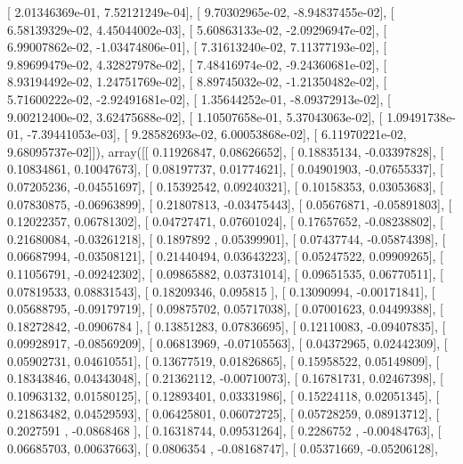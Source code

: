 \documentclass{article}
\begin{document}
       [  2.01346369e-01,   7.52121249e-04],
       [  9.70302965e-02,  -8.94837455e-02],
       [  6.58139329e-02,   4.45044002e-03],
       [  5.60863133e-02,  -2.09296947e-02],
       [  6.99007862e-02,  -1.03474806e-01],
       [  7.31613240e-02,   7.11377193e-02],
       [  9.89699479e-02,   4.32827978e-02],
       [  7.48416974e-02,  -9.24360681e-02],
       [  8.93194492e-02,   1.24751769e-02],
       [  8.89745032e-02,  -1.21350482e-02],
       [  5.71600222e-02,  -2.92491681e-02],
       [  1.35644252e-01,  -8.09372913e-02],
       [  9.00212400e-02,   3.62475688e-02],
       [  1.10507658e-01,   5.37043063e-02],
       [  1.09491738e-01,  -7.39441053e-03],
       [  9.28582693e-02,   6.00053868e-02],
       [  6.11970221e-02,   9.68095737e-02]]), array([[ 0.11926847,  0.08626652],
       [ 0.18835134, -0.03397828],
       [ 0.10834861,  0.10047673],
       [ 0.08197737,  0.01774621],
       [ 0.04901903, -0.07655337],
       [ 0.07205236, -0.04551697],
       [ 0.15392542,  0.09240321],
       [ 0.10158353,  0.03053683],
       [ 0.07830875, -0.06963899],
       [ 0.21807813, -0.03475443],
       [ 0.05676871, -0.05891803],
       [ 0.12022357,  0.06781302],
       [ 0.04727471,  0.07601024],
       [ 0.17657652, -0.08238802],
       [ 0.21680084, -0.03261218],
       [ 0.1897892 ,  0.05399901],
       [ 0.07437744, -0.05874398],
       [ 0.06687994, -0.03508121],
       [ 0.21440494,  0.03643223],
       [ 0.05247522,  0.09909265],
       [ 0.11056791, -0.09242302],
       [ 0.09865882,  0.03731014],
       [ 0.09651535,  0.06770511],
       [ 0.07819533,  0.08831543],
       [ 0.18209346,  0.095815  ],
       [ 0.13090994, -0.00171841],
       [ 0.05688795, -0.09179719],
       [ 0.09875702,  0.05717038],
       [ 0.07001623,  0.04499388],
       [ 0.18272842, -0.0906784 ],
       [ 0.13851283,  0.07836695],
       [ 0.12110083, -0.09407835],
       [ 0.09928917, -0.08569209],
       [ 0.06813969, -0.07105563],
       [ 0.04372965,  0.02442309],
       [ 0.05902731,  0.04610551],
       [ 0.13677519,  0.01826865],
       [ 0.15958522,  0.05149809],
       [ 0.18343846,  0.04343048],
       [ 0.21362112, -0.00710073],
       [ 0.16781731,  0.02467398],
       [ 0.10963132,  0.01580125],
       [ 0.12893401,  0.03331986],
       [ 0.15224118,  0.02051345],
       [ 0.21863482,  0.04529593],
       [ 0.06425801,  0.06072725],
       [ 0.05728259,  0.08913712],
       [ 0.2027591 , -0.0868468 ],
       [ 0.16318744,  0.09531264],
       [ 0.2286752 , -0.00484763],
       [ 0.06685703,  0.00637663],
       [ 0.0806354 , -0.08168747],
       [ 0.05371669, -0.05206128],
\end{document}
